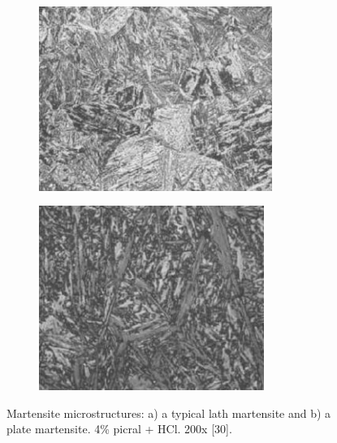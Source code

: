 \documentclass[12pt]{report}
\begin{document}
\begin{figure}[H]
\centering

\begin{subfigure}{.45\textwidth}
    \centering
    \includegraphics[height=6cm, width=\textwidth]{lath_martensite_microstructure.jpg}
    \caption{}
\end{subfigure}
\begin{subfigure}{.45\textwidth}
    \centering
    \includegraphics[height=6cm, width=\textwidth]{plate_martensite_microstructure.jpg}
    \caption{}
\end{subfigure}

\caption{Martensite microstructures: a) a typical lath martensite and b) a plate martensite. 4\% picral + HCl. 200x [30].}
\label{ch3:figure:martensite:microstructures}
\end{figure}
\end{document}
